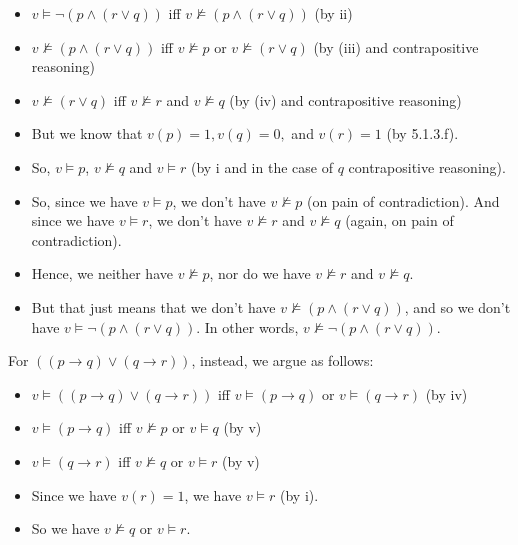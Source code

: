 \begin{enumerate}[\thesection.1]
\begin{itemize}
			\item $v\vDash \neg (p\land (r\lor q))$ iff $v\nvDash (p\land (r\lor q))$ (by ii)
			
			\item $v\nvDash (p\land (r\lor q))$ iff $v\nvDash p$ or $v\nvDash (r\lor q)$ (by (iii) and contrapositive reasoning)
			
			\item $v\nvDash (r\lor q)$ iff $v\nvDash r$ and $v\nvDash q$ (by (iv) and contrapositive reasoning)
			
			\item But we know that $v(p)=1, v(q)=0,$ and $v(r)=1$ (by 5.1.3.f).
			
			\item So, $v\vDash p$, $v\nvDash q$ and $v\vDash r$ (by i and in the case of $q$ contrapositive reasoning).
			
			\item So, since we have $v\vDash p$, we don't have $v\nvDash p$ (on pain of contradiction). And since we have $v\vDash r$, we don't have $v\nvDash r$ and $v\nvDash q$ (again, on pain of contradiction). 
			
			\item Hence, we neither have $v\nvDash p$, nor do we have $v\nvDash r$ and $v\nvDash q$.
			
			\item But that just means that we don't have $v\nvDash (p\land (r\lor q))$, and so we don't have $v\vDash \neg (p\land (r\lor q))$. In other words, $v\nvDash \neg (p\land (r\lor q))$.
		
		\end{itemize}
For $((p\to q)\lor (q\to r))$, instead, we argue as follows:
	\begin{itemize}
	
		\item $v\vDash((p\to q)\lor (q\to r))$ iff $v\vDash (p\to q)$ or $v\vDash (q\to r)$ (by iv) 
		
		\item $v\vDash (p\to q)$ iff $v\nvDash p$ or $v\vDash q$ (by v)
		
		\item $v\vDash (q\to r)$ iff $v\nvDash q$ or $v\vDash r$ (by v)
	
		\item Since we have $v(r)=1$, we have $v\vDash r$ (by i).
		
		\item So we have $v\nvDash q$ or $v\vDash r$.
		

\end{itemize}
\end{enumerate}
